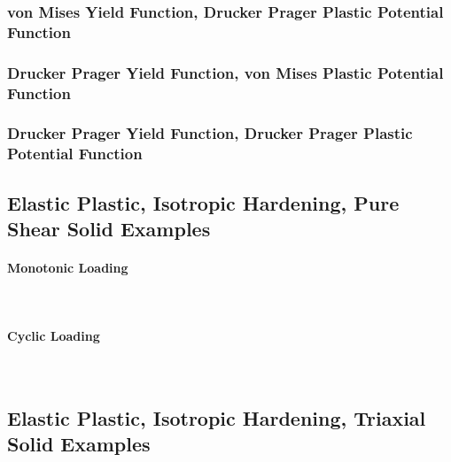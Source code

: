 \documentclass[fleqn,11pt]{article}
\begin{document}
\subsubsection{von Mises Yield Function, Drucker Prager Plastic Potential Function}


\subsubsection{Drucker Prager Yield Function, von Mises Plastic Potential Function}

\subsubsection{Drucker Prager Yield Function, Drucker Prager Plastic Potential Function}



\subsection{Elastic  Plastic, Isotropic Hardening,  Pure Shear Solid Examples}

\paragraph{Monotonic Loading} ~


\paragraph{Cyclic Loading} ~



\subsection{Elastic Plastic, Isotropic Hardening, Triaxial Solid Examples}
\end{document}
